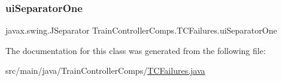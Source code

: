 \mbox{\label{classTrainControllerComps_1_1TCFailures_addc1377b0e7ab921bba464c9892593e6}} 
\subsubsection{\texorpdfstring{ui\+Separator\+One}{uiSeparatorOne}}
{\footnotesize\ttfamily javax.\+swing.\+J\+Separator Train\+Controller\+Comps.\+T\+C\+Failures.\+ui\+Separator\+One\hspace{0.3cm}{\ttfamily [private]}}



The documentation for this class was generated from the following file\+:\begin{DoxyCompactItemize}
\item 
src/main/java/\+Train\+Controller\+Comps/\hyperlink{TCFailures_8java}{T\+C\+Failures.\+java}\end{DoxyCompactItemize}

